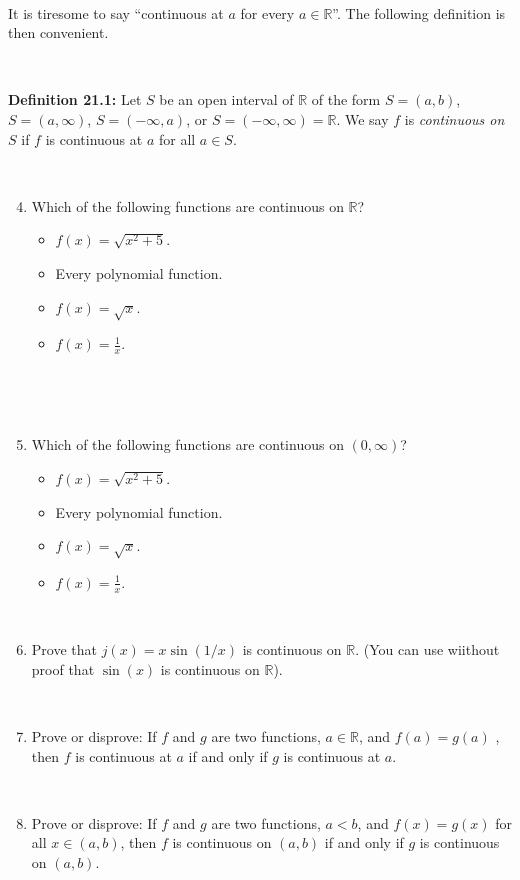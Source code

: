 \documentclass[12pt]{amsart}
\newcommand{\R}{\mathbb{R}}
\begin{document}
 \
 
 \begin{framed}
\noindent It is tiresome to say ``continuous at $a$ for every $a\in \R$''. The following definition is then convenient.

\

\noindent \textbf{Definition 21.1:}  Let $S$ be an open interval of $\R$ of the form $S=(a,b)$, $S=(a,\infty)$, $S=(-\infty,a)$, or $S=(-\infty,\infty)=\R$. We say $f$ is {\em continuous on $S$} if $f$ is continuous at $a$ for all $a\in S$. 

 
 \end{framed}
 
 \
 
 \begin{enumerate}
 \setcounter{enumi}{3}
 \item Which of the following functions are continuous on $\R$?
\begin{multicols}{2} 
\begin{itemize}
 \item $f(x)=\sqrt{ x^2 +5}$.
 \item Every polynomial function.
  \item $f(x) = \sqrt{x}$.
  \item $f(x)=\frac{1}{x}$.
 \end{itemize}
 \end{multicols}
 
 \
 
 \
 
 \item Which of the following functions are continuous on $(0,\infty)$?
 \begin{multicols}{2} 
 \begin{itemize}
 \item $f(x)=\sqrt{ x^2 +5}$.
 \item Every polynomial function.
  \item $f(x) = \sqrt{x}$.
  \item $f(x)=\frac{1}{x}$.
 \end{itemize}
 \end{multicols}
 
 \
 
 \item Prove that $j(x) = x \sin(1/x)$ is continuous on $\R$. (You can use wiithout proof that $\sin(x)$ is continuous on $\R$).
 
 \
 
 \item Prove or disprove: If $f$ and $g$ are two functions, $a\in \R$, and  $f(a)=g(a)$ , then $f$ is continuous at $a$ if and only if $g$ is continuous at $a$.
 
 \

 
 \item Prove or disprove: If $f$ and $g$ are two functions, $a<b$, and  $f(x)=g(x)$ for all $x\in (a,b)$, then $f$ is continuous on $(a,b)$ if and only if $g$ is continuous on $(a,b)$.
   \end{enumerate}
 
\end{document}
